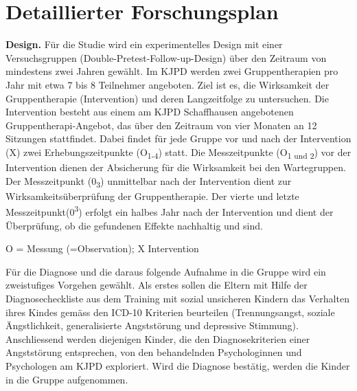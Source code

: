 %
%
\chapter{Detaillierter Forschungsplan}\label{chap.forschungsplan}
\glsresetall
\textbf{Design.} 
Für die Studie wird ein experimentelles Design mit einer Versuchsgruppen (Double-Pretest-Follow-up-Design) über den Zeitraum von mindestens zwei Jahren gewählt. Im KJPD werden zwei Gruppentherapien pro Jahr mit etwa 7 bis 8 Teilnehmer angeboten. Ziel ist es, die Wirksamkeit der Gruppentherapie (Intervention) und deren Langzeitfolge zu untersuchen. Die Intervention besteht aus einem am KJPD Schaffhausen angebotenen Gruppentherapi-Angebot, das über den Zeitraum von vier Monaten an 12 Sitzungen stattfindet. Dabei findet für jede Gruppe vor und nach der Intervention (X) zwei Erhebungszeitpunkte (O\textsubscript{1-4}) statt. Die Messzeitpunkte (O\textsubscript{1 und 2}) vor der Intervention dienen der Absicherung für die Wirksamkeit bei den Wartegruppen. Der Messzeitpunkt (0\textsubscript{3}) unmittelbar nach der Intervention dient zur Wirksamkeitsüberprüfung der Gruppentherapie. Der vierte und letzte Messzeitpunkt(0\textsuperscript{3}) erfolgt ein halbes Jahr nach der Intervention und dient der Überprüfung, ob die gefundenen Effekte nachhaltig und sind.
\begin{center}
    
    O = Messung (=Observation); X Intervention
\end{center}
Für die Diagnose und die daraus folgende Aufnahme in die Gruppe wird ein zweistufiges Vorgehen gewählt. Als erstes sollen die Eltern mit Hilfe der Diagnosecheckliste aus dem Training mit sozial unsicheren Kindern \cite{Petermann:2015} das Verhalten ihres Kindes gemäss den ICD-10 Kriterien beurteilen (Trennungsangst, soziale Ängstlichkeit, generalisierte Angststörung und depressive Stimmung). Anschliessend werden diejenigen Kinder, die den Diagnosekriterien einer Angststörung entsprechen, von den behandelnden Psychologinnen und Psychologen am KJPD exploriert. Wird die Diagnose bestätig, werden die Kinder in die Gruppe aufgenommen. 

